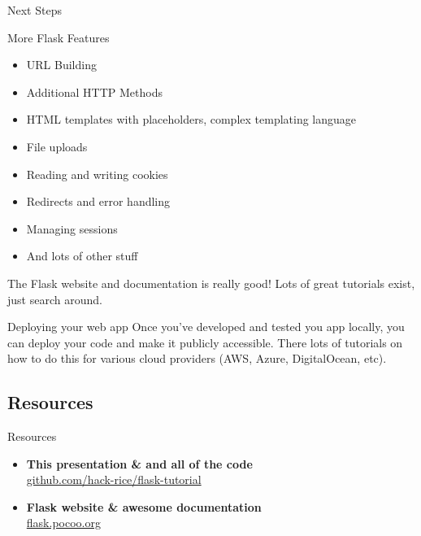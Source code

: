 \documentclass{beamer}
\begin{document}
	\begin{frame}[t]{Next Steps}
		\begin{block}{More Flask Features}
			\begin{itemize}
				\item{URL Building}
				\item{Additional HTTP Methods}
				\item{HTML templates with placeholders, complex templating
						language}
				\item{File uploads}
				\item{Reading and writing cookies}
				\item{Redirects and error handling}
				\item{Managing sessions}
				\item{And lots of other stuff}
			\end{itemize}
		\end{block}

		 The Flask website and documentation is really good! Lots of great
		 tutorials exist, just search around.
	\end{frame}

	\begin{frame}[t]{Deploying your web app}
		Once you've developed and tested you app locally, you can deploy
		your code and make it publicly accessible. There lots of
		tutorials on how to do this for various cloud providers (AWS,
		Azure, DigitalOcean, etc).
	\end{frame}


\subsection{Resources}
	\begin{frame}[t]{Resources}
		\begin{itemize}
			\item{
				\textbf{This presentation \& and all of the code}\\
				\indent \url{github.com/hack-rice/flask-tutorial}
			}
			\item{
				\textbf{Flask website \& awesome documentation}\\
				\indent \url{flask.pocoo.org}
			}
		\end{itemize}
	\end{frame}
\end{document}

